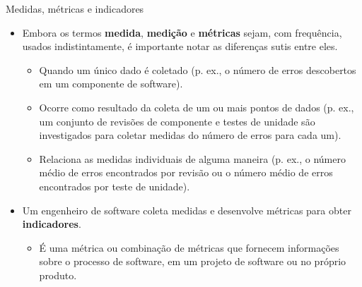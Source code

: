 \documentclass{beamer}
\begin{document}
\begin{frame}{Medidas, métricas e indicadores}
	\begin{itemize}
		\justifying
		\item<1-4> Embora os termos \alert<2>{\textbf{medida}}, \alert<3>{\textbf{medição}} e \alert<4>{\textbf{métricas}} sejam, com frequência, usados indistintamente, é importante notar as diferenças sutis entre eles.
			\begin{itemize}
				\justifying
				\item<2> Quando um único dado é coletado (p. ex., o número de erros descobertos em um componente de software).
				\item<3> Ocorre como resultado da coleta de um ou mais pontos de dados (p. ex., um conjunto de revisões de componente e testes de unidade são investigados para coletar medidas do número de erros para cada um).
				\item<4> Relaciona as medidas individuais de alguma maneira (p. ex., o número médio de erros encontrados por revisão ou o número médio de erros encontrados por teste de unidade).
			\end{itemize}
		\item<5-> Um engenheiro de software coleta medidas e desenvolve métricas para obter \alert<6>{\textbf{indicadores}}.
			\begin{itemize}
				\justifying
				\item<6> É uma métrica ou combinação de métricas que fornecem informações sobre o processo de software, em um projeto de software ou no próprio produto.
			\end{itemize}
	\end{itemize}
\end{frame}
\end{document}
